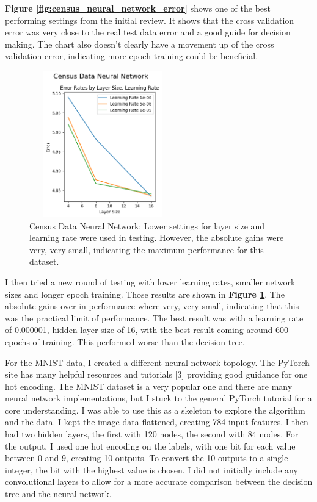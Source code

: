 \documentclass[letterpaper]{article} %
\begin{document}
\textbf{Figure \ref{fig:census_neural_network_error}} shows one of the best performing settings from the initial review.  It shows that the cross validation error was very close to the real test data error and a good guide for decision making.  The chart also doesn't clearly have a movement up of the cross validation error, indicating more epoch training could be beneficial.

\begin{figure}[h]
\centering
\includegraphics[width=2.5in, height=2.5in]{figures/Census_Data_Neural_Network_Error_Rates_by_Layer_Size__Learning_Rate_census_v2.png}
\caption{Census Data Neural Network:   Lower settings for layer size and learning rate were used in testing.   However, the absolute gains were very, very small, indicating the maximum performance for this dataset.   }
\label{fig:census_neural_network_v2}
\end{figure}

I then tried a new round of testing with lower learning rates, smaller network sizes and longer epoch training.  Those results are shown in \textbf{Figure \ref{fig:census_neural_network_v2}}.  The absolute gains over in performance where very, very small, indicating that this was the practical limit of performance.  The best result was with a learning rate of 0.000001, hidden layer size of 16, with the best result coming around 600 epochs of training.  This performed worse than the decision tree. 

For the MNIST data, I created a different neural network topology.  The PyTorch site has many helpful resources and tutorials [3] providing good guidance for one hot encoding.  The MNIST dataset is a very popular one and there are many neural network implementations, but I stuck to the general PyTorch tutorial for a core understanding.  I was able to use this as a skeleton to explore the algorithm and the data. I kept the image data flattened, creating 784 input features.  I then had two hidden layers, the first with 120 nodes, the second with 84 nodes.  For the output, I used one hot encoding on the labels, with one bit for each value between 0 and 9, creating 10 outputs.  To convert the 10 outputs to a single integer, the bit with the highest value is chosen.  I did not initially include any convolutional layers to allow for a more accurate comparison between the decision tree and the neural network.
\end{document}
